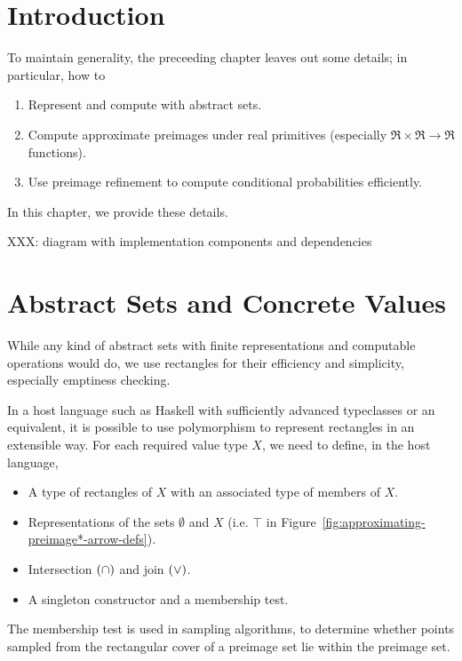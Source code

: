 
\DeclarePairedDelimiter{\ivl}{[\mspace{-4.5mu}(}{)\mspace{-4.5mu}]}

\section{Introduction}

To maintain generality, the preceeding chapter leaves out some details; in particular, how to
\begin{enumerate}
	\item Represent and compute with abstract sets.
	\item Compute approximate preimages under real primitives (especially $\Re \times \Re \to \Re$ functions).
	\item Use preimage refinement to compute conditional probabilities efficiently.
\end{enumerate}
In this chapter, we provide these details.

XXX: diagram with implementation components and dependencies

\section{Abstract Sets and Concrete Values}

While any kind of abstract sets with finite representations and computable operations would do, we use rectangles for their efficiency and simplicity, especially emptiness checking.

In a host language such as Haskell with sufficiently advanced typeclasses or an equivalent, it is possible to use polymorphism to represent rectangles in an extensible way.
For each required value type $X$, we need to define, in the host language,
\begin{itemize}
	\item A type of rectangles of $X$ with an associated type of members of $X$.
	\item Representations of the sets $\emptyset$ and $X$ (i.e. $\top$ in Figure~\ref{fig:approximating-preimage*-arrow-defs}).
	\item Intersection $(\cap)$ and join $(\vee)$.
	\item A singleton constructor and a membership test.
\end{itemize}
The membership test is used in sampling algorithms, to determine whether points sampled from the rectangular cover of a preimage set lie within the preimage set.

